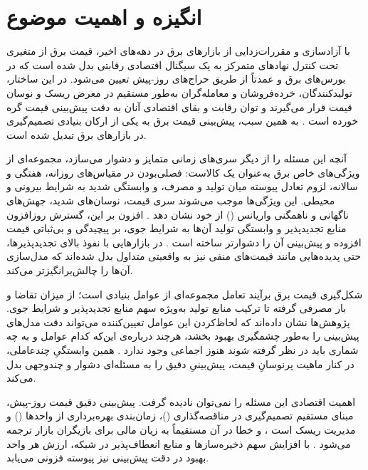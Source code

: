 
\section{انگیزه و اهمیت موضوع}

با آزادسازی و مقررات‌زدایی از بازارهای برق در دهه‌های اخیر، قیمت برق از متغیری
تحت کنترل نهادهای متمرکز به یک سیگنال اقتصادی رقابتی بدل شده است که در بورس‌های
برق و عمدتاً از طریق حراج‌های روز-پیش تعیین می‌شود. در این ساختار، تولیدکنندگان،
خرده‌فروشان و معامله‌گران به‌طور مستقیم در معرض ریسک و نوسان قیمت قرار می‌گیرند و
توان رقابت و بقای اقتصادی آنان به دقت پیش‌بینی قیمت گره خورده است
\cite{cerjan_literature_2013, jiang_review_2018}. به همین سبب، پیش‌بینی قیمت برق
به یکی از ارکان بنیادی تصمیم‌گیری در بازارهای برق تبدیل شده است.

آنچه این مسئله را از دیگر سری‌های زمانی متمایز و دشوار می‌سازد، مجموعه‌ای از
ویژگی‌های خاص برق به‌عنوان یک کالاست: فصلی‌بودن در مقیاس‌های روزانه، هفتگی و
سالانه، لزوم تعادل پیوسته میان تولید و مصرف، و وابستگی شدید به شرایط بیرونی و
محیطی. این ویژگی‌ها موجب می‌شوند سری قیمت، نوسان‌های شدید، جهش‌های ناگهانی و
ناهمگنی واریانس () از خود نشان دهد
\cite{jiang_review_2018}. افزون بر این، گسترش روزافزون منابع تجدیدپذیر و وابستگی
تولید آن‌ها به شرایط جوی، بر پیچیدگی و بی‌ثباتی قیمت افزوده و پیش‌بینی آن را
دشوارتر ساخته است \cite{oconnor_review_2025, cerjan_literature_2013}. در
بازارهایی با نفوذ بالای تجدیدپذیرها، حتی پدیده‌هایی مانند قیمت‌های منفی نیز به
واقعیتی متداول بدل شده‌اند که مدل‌سازی آن‌ها را چالش‌برانگیزتر می‌کند.

شکل‌گیری قیمت برق برآیند تعامل مجموعه‌ای از عوامل بنیادی است؛ از میزان تقاضا و
بار مصرفی گرفته تا ترکیب منابع تولید  به‌ویژه سهم منابع تجدیدپذیر  و
شرایط جوی. پژوهش‌ها نشان داده‌اند که لحاظ‌کردن این عوامل تعیین‌کننده می‌تواند دقت
مدل‌های پیش‌بینی را به‌طور چشمگیری بهبود بخشد، هرچند درباره‌ی این‌که کدام عوامل و
به چه شماری باید در نظر گرفته شوند هنوز اجماعی وجود ندارد
\cite{chai_forecasting_2024}. همین وابستگیِ چندعاملی، در کنار ماهیت پرنوسانِ
قیمت، پیش‌بینیِ دقیق را به مسئله‌ای دشوار و چندوجهی بدل می‌کند.

اهمیت اقتصادی این مسئله را نمی‌توان نادیده گرفت. پیش‌بینی دقیق قیمت روز-پیش،
مبنای مستقیم تصمیم‌گیری در مناقصه‌گذاری ()، زمان‌بندی بهره‌برداری از
واحدها () و مدیریت ریسک است \cite{oconnor_review_2025}، و خطا در
آن مستقیماً به زیان مالی برای بازیگران بازار ترجمه می‌شود
\cite{chai_forecasting_2024}. با افزایش سهم ذخیره‌سازها و منابع انعطاف‌پذیر در
شبکه، ارزش هر واحد بهبود در دقت پیش‌بینی نیز پیوسته فزونی می‌یابد.

